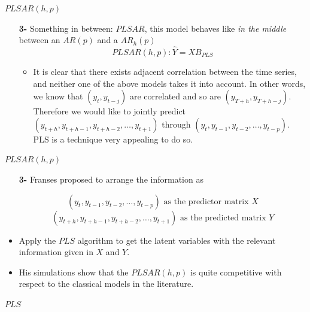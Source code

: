 \documentclass{beamer}
\newcommand{\?}{?`}
\begin{document}
\begin{frame}{$PLSAR(h,p)$}
  \begin{itemize}
  \item[\textbf{3-}] Something in between: $PLSAR$, this model behaves like {\it{ in the middle }} between an $AR(p)$ and a $AR_h(p)$
    \begin{displaymath}
      PLSAR(h,p): \hat{Y}=XB_{PLS}
    \end{displaymath}
    \begin{itemize}
    \item It is clear that there exists adjacent correlation between the time series, and neither one of the above models takes it into account.
    In other words, we know that $(y_t,y_{t-j})$ are correlated and so are $(y_{T+h},y_{T+h-j})$.
    Therefore we would like to jointly predict $(y_{t+h},y_{t+h-1},y_{t+h-2},\ldots,y_{t+1})$ through
    $(y_{t},y_{t-1},y_{t-2},\ldots,y_{t-p})$. PLS is a technique very appealing to do so.
    \end{itemize}
  \end{itemize}
\end{frame}

\begin{frame}{$PLSAR(h,p)$}
  \begin{itemize}
  \item[\textbf{3-}]   Franses proposed to arrange the information as

      \begin{displaymath}
        (y_{t},y_{t-1},y_{t-2},\ldots,y_{t-p}) \text{ as the predictor matrix
           } X
      \end{displaymath}
      \begin{displaymath}
        (y_{t+h},y_{t+h-1},y_{t+h-2},\ldots,y_{t+1})
        \text{ as the predicted matrix } Y
      \end{displaymath}
      \bigskip
      \item Apply the $PLS$ algorithm to get the latent variables with the relevant information given in $X $ and $Y$.
      \medskip
     \item His simulations show that the $PLSAR(h,p)$ is quite competitive with respect to the classical models in the literature.
  \end{itemize}
\end{frame}

\begin{frame}{}
  \begin{block}{}
    \begin{center}
      \vspace{3mm}
      {\Large $PLS$}
      \vspace{3mm}
    \end{center}
  \end{block}
\end{frame}
\end{document}
